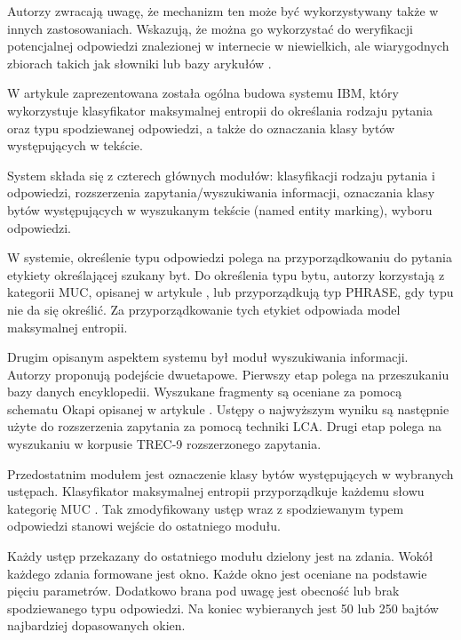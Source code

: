 Autorzy \cite{brill2001data} zwracają uwagę, że mechanizm ten może być wykorzystywany także w innych zastosowaniach. Wskazują, że można go wykorzystać do weryfikacji potencjalnej odpowiedzi znalezionej w internecie w niewielkich, ale wiarygodnych zbiorach takich jak słowniki lub bazy arykułów \cite{brill2001data}.

W artykule \cite{Ittycheriah00ibm'sstatistical} zaprezentowana została ogólna budowa systemu IBM, który wykorzystuje klasyfikator maksymalnej entropii do określania rodzaju pytania oraz typu spodziewanej odpowiedzi, a także do oznaczania klasy bytów występujących w tekście. 

System składa się z czterech głównych modułów: klasyfikacji rodzaju pytania i odpowiedzi, rozszerzenia zapytania/wyszukiwania informacji, oznaczania klasy bytów występujących w wyszukanym tekście (named entity marking), wyboru odpowiedzi. 

W systemie, określenie typu odpowiedzi polega na przyporządkowaniu do pytania etykiety określającej szukany byt. Do określenia typu bytu, autorzy korzystają z kategorii MUC, opisanej w artykule \cite{chinchor-robinson-1998-appendix}, lub przyporządkują typ PHRASE, gdy typu nie da się określić. Za przyporządkowanie tych etykiet odpowiada model maksymalnej entropii. 

Drugim opisanym aspektem systemu był moduł wyszukiwania informacji. Autorzy proponują podejście dwuetapowe. Pierwszy etap polega na przeszukaniu bazy danych encyklopedii. Wyszukane fragmenty są oceniane za pomocą schematu Okapi opisanej w artykule \cite{RobertsonOkapi}. Ustępy o najwyższym wyniku są następnie użyte do rozszerzenia zapytania za pomocą techniki LCA. Drugi etap polega na wyszukaniu w korpusie TREC-9 rozszerzonego zapytania.

Przedostatnim modułem jest oznaczenie klasy bytów występujących w wybranych ustępach. Klasyfikator maksymalnej entropii przyporządkuje każdemu słowu kategorię MUC \cite{chinchor-robinson-1998-appendix}. Tak zmodyfikowany ustęp wraz z spodziewanym typem odpowiedzi stanowi wejście do ostatniego modułu.

Każdy ustęp przekazany do ostatniego modułu dzielony jest na zdania. Wokół każdego zdania formowane jest okno. Każde okno jest oceniane na podstawie pięciu parametrów. Dodatkowo brana pod uwagę jest obecność lub brak spodziewanego typu odpowiedzi. Na koniec wybieranych jest 50 lub 250 bajtów najbardziej dopasowanych okien\cite{Ittycheriah00ibm'sstatistical}. 

